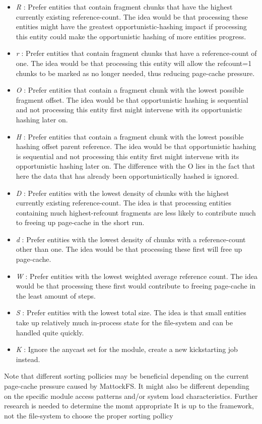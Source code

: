 \begin{itemize}
\item \emph{R} : Prefer entities that contain fragment chunks that have the highest currently existing reference-count. The idea would be that processing these entities might have the greatest opportunistic-hashing impact if processing this entity could make the opportunistic hashing of more entities progress.
\item \emph{r} : Prefer entities that contain fragment chunks that have a reference-count of one. The idea would be that processing this entity will allow the refcount=1 chunks to be marked as no longer needed, thus reducing page-cache pressure.
\item \emph{O} : Prefer entities that contain a fragment chunk with the lowest possible fragment offset. The idea would be that opportunistic hashing is sequential and not processing this entity first might intervene with its opportunistic hashing later on.
\item \emph{H} : Prefer entities that contain a fragment chunk with the lowest possible hashing offset parent reference. The idea would be that opportunistic hashing is sequential and not processing this entity first might intervene with its opportunistic hashing later on. The difference with the O lies in the fact that here the data that has already been opportunistically hashed is ignored.
\item \emph{D} : Prefer entities with the lowest density of chunks with the highest currently existing reference-count. The idea is that processing entities containing much highest-refcount fragments are less likely to contribute much to freeing up page-cache in the short run.
\item \emph{d} : Prefer entities with the lowest density of chunks with  a reference-count other than one. The idea would be that processing these first will free up page-cache.
\item \emph{W} : Prefer entities with the lowest weighted average reference count. The idea would be that processing these first would contribute to freeing page-cache in the least amount of steps.
\item \emph{S} : Prefer entities with the lowest total size. The idea is that small entities take up relatively much in-process state for the file-system and can be handled quite quickly.
\item \emph{K} : Ignore the anycast set for the module, create a new kickstarting job instead.
\end{itemize}
Note that different sorting pollicies may be beneficial depending on the current page-cache pressure caused by MattockFS\@.
It might also be different depending on the specific module access patterns and/or system load characteristics. Further research is needed to determine the momt appropriate It is up to the framework, not the file-system to choose the proper sorting pollicy 
